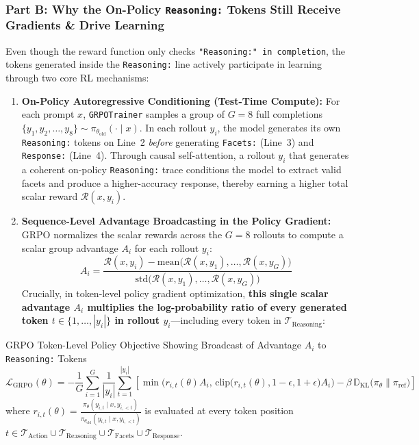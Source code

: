 \documentclass[10pt,letterpaper]{article}
\begin{document}
\subsubsection*{Part B: Why the On-Policy \texttt{Reasoning:} Tokens Still Receive Gradients \& Drive Learning}
Even though the reward function only checks \texttt{"Reasoning:" in completion}, the tokens generated inside the \texttt{Reasoning:} line actively participate in learning through two core RL mechanisms:

\begin{enumerate}[leftmargin=18pt, itemsep=3pt]
    \item \textbf{On-Policy Autoregressive Conditioning (Test-Time Compute):} For each prompt $x$, \texttt{GRPOTrainer} samples a group of $G=8$ full completions $\{y_1, y_2, \dots, y_8\} \sim \pi_{\theta_{\text{old}}}(\cdot \mid x)$. In each rollout $y_i$, the model generates its own \texttt{Reasoning:} tokens on Line~2 \textit{before} generating \texttt{Facets:} (Line~3) and \texttt{Response:} (Line~4). Through causal self-attention, a rollout $y_i$ that generates a coherent on-policy \texttt{Reasoning:} trace conditions the model to extract valid facets and produce a higher-accuracy response, thereby earning a higher total scalar reward $\mathcal{R}(x, y_i)$.
    \item \textbf{Sequence-Level Advantage Broadcasting in the Policy Gradient:} GRPO normalizes the scalar rewards across the $G=8$ rollouts to compute a scalar group advantage $A_i$ for each rollout $y_i$:
    \begin{equation}
    A_i = \frac{\mathcal{R}(x, y_i) - \text{mean}\big(\mathcal{R}(x, y_1), \dots, \mathcal{R}(x, y_G)\big)}{\text{std}\big(\mathcal{R}(x, y_1), \dots, \mathcal{R}(x, y_G)\big)}
    \end{equation}
    Crucially, in token-level policy gradient optimization, \textbf{this single scalar advantage $A_i$ multiplies the log-probability ratio of every generated token $t \in \{1, \dots, |y_i|\}$ in rollout $y_i$}---including every token in $\mathcal{T}_{\text{Reasoning}}$:
\end{enumerate}

\begin{mathbox}{GRPO Token-Level Policy Objective Showing Broadcast of Advantage $A_i$ to \texttt{Reasoning:} Tokens}
\begin{equation}
\mathcal{L}_{\text{GRPO}}(\theta) = -\frac{1}{G} \sum_{i=1}^{G} \frac{1}{|y_i|} \sum_{t=1}^{|y_i|} \left[ \min\!\Big( r_{i,t}(\theta) A_i, \, \text{clip}\big(r_{i,t}(\theta), 1-\epsilon, 1+\epsilon\big) A_i \Big) - \beta \, \mathbb{D}_{\text{KL}}\big(\pi_\theta \parallel \pi_{\text{ref}}\big) \right]
\end{equation}
where $r_{i,t}(\theta) = \frac{\pi_\theta(y_{i,t} \mid x, y_{i,<t})}{\pi_{\theta_{\text{old}}}(y_{i,t} \mid x, y_{i,<t})}$ is evaluated at every token position $t \in \mathcal{T}_{\text{Action}} \cup \mathcal{T}_{\text{Reasoning}} \cup \mathcal{T}_{\text{Facets}} \cup \mathcal{T}_{\text{Response}}$.
\end{mathbox}
\end{document}
